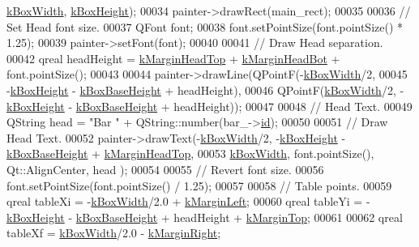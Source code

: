 \begin{DoxyCode}
      \hyperlink{class_info_bar_aa1c35ddbae0324743d90721037447571}{kBoxWidth}, \hyperlink{class_info_bar_aba381a3838a5e064f1372f2f2b4d8e0d}{kBoxHeight});
00034   painter->drawRect(main\_rect);
00035 
00036   \textcolor{comment}{// Set Head font size.}
00037   QFont font;
00038   font.setPointSize(font.pointSize() * 1.25);
00039   painter->setFont(font);
00040 
00041   \textcolor{comment}{// Draw Head separation.}
00042   qreal headHeight = \hyperlink{class_info_bar_ae24b5cac460550a4c86203a3dbd96ba9}{kMarginHeadTop} + \hyperlink{class_info_bar_a0cfbafbc9f780fc1366157b9c8379463}{kMarginHeadBot} + font.pointSize();
00043 
00044   painter->drawLine(QPointF(-\hyperlink{class_info_bar_aa1c35ddbae0324743d90721037447571}{kBoxWidth}/2,
00045                             -\hyperlink{class_info_bar_aba381a3838a5e064f1372f2f2b4d8e0d}{kBoxHeight} - \hyperlink{class_info_bar_a28fb5e5d6d399d9327f67aa768d4a3d8}{kBoxBaseHeight} + headHeight),
00046                     QPointF(\hyperlink{class_info_bar_aa1c35ddbae0324743d90721037447571}{kBoxWidth}/2, -\hyperlink{class_info_bar_aba381a3838a5e064f1372f2f2b4d8e0d}{kBoxHeight} - 
      \hyperlink{class_info_bar_a28fb5e5d6d399d9327f67aa768d4a3d8}{kBoxBaseHeight} + headHeight));
00047 
00048   \textcolor{comment}{// Head Text.}
00049   QString head = \textcolor{stringliteral}{"Bar "} + QString::number(bar\_->\hyperlink{class_bar_a9dc5c6a6d44fe412ae34ef8a881b8dce}{id});
00050 
00051   \textcolor{comment}{// Draw Head Text.}
00052   painter->drawText(-\hyperlink{class_info_bar_aa1c35ddbae0324743d90721037447571}{kBoxWidth}/2, -\hyperlink{class_info_bar_aba381a3838a5e064f1372f2f2b4d8e0d}{kBoxHeight} - 
      \hyperlink{class_info_bar_a28fb5e5d6d399d9327f67aa768d4a3d8}{kBoxBaseHeight} + \hyperlink{class_info_bar_ae24b5cac460550a4c86203a3dbd96ba9}{kMarginHeadTop},
00053                     \hyperlink{class_info_bar_aa1c35ddbae0324743d90721037447571}{kBoxWidth}, font.pointSize(), Qt::AlignCenter, head );
00054 
00055   \textcolor{comment}{// Revert font size.}
00056   font.setPointSize(font.pointSize() / 1.25);
00057 
00058   \textcolor{comment}{// Table points.}
00059   qreal tableXi = -\hyperlink{class_info_bar_aa1c35ddbae0324743d90721037447571}{kBoxWidth}/2.0 + \hyperlink{class_info_bar_a3c7688259f189cb28c2682f50a59335a}{kMarginLeft};
00060   qreal tableYi = -\hyperlink{class_info_bar_aba381a3838a5e064f1372f2f2b4d8e0d}{kBoxHeight} - \hyperlink{class_info_bar_a28fb5e5d6d399d9327f67aa768d4a3d8}{kBoxBaseHeight} + headHeight + 
      \hyperlink{class_info_bar_add145842c6a2331a7edf9e5be301e5b4}{kMarginTop};
00061 
00062   qreal tableXf = \hyperlink{class_info_bar_aa1c35ddbae0324743d90721037447571}{kBoxWidth}/2.0 - \hyperlink{class_info_bar_a2ce020e319adf3de887bf17e803887a3}{kMarginRight};

\end{DoxyCode}

